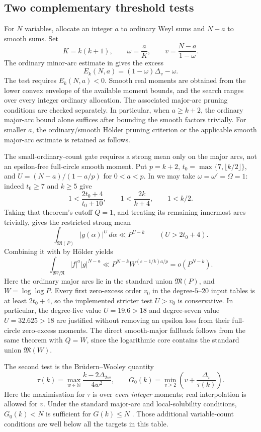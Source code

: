 \documentclass[11pt,letterpaper]{article}
\numberwithin{equation}{section}
\begin{document}
\subsection{Two complementary threshold tests}

For $N$ variables, allocate an integer $a$ to ordinary Weyl sums and $N-a$
to smooth sums. Set
\[
 K=k(k+1),\qquad \omega=\frac aK,\qquad
 v=\frac{N-a}{1-\omega}.
\]
The ordinary minor-arc estimate in \cite[Lemma~3.1]{W16} gives the excess
\[
 E_k(N,a)=(1-\omega)\Delta_v-\omega.               \tag{S1}
\]
The test requires $E_k(N,a)<0$. Smooth real moments are obtained from the
lower convex envelope of the available moment bounds, and the search ranges
over every integer ordinary allocation. The associated major-arc pruning
conditions are checked separately. In particular, when $a\ge k+2$, the
ordinary major-arc bound alone suffices after bounding the smooth factors
trivially. For smaller $a$, the ordinary/smooth H\"older pruning criterion
or the applicable smooth major-arc estimate is retained as follows.

The small-ordinary-count gate requires a strong mean only on the major arcs,
not an epsilon-free full-circle smooth moment. Put
$p=k+2$, $t_0=\max\{7,\lfloor k/2\rfloor\}$, and
$U=(N-a)/(1-a/p)$ for $0<a<p$. In
\cite[Theorem~1.3]{BW24} we may take $\omega=\omega'=\Omega=1$:
indeed $t_0\ge7$ and $k\ge5$ give
\[
 1<\frac{2t_0+4}{t_0+10},\qquad
 1<\frac{2k}{k+4},\qquad 1<k/2.
\]
Taking that theorem's cutoff $Q=1$, and treating its remaining innermost
arcs trivially, gives the restricted strong mean
\[
 \int_{\mathfrak M(P)}|g(\alpha)|^U\,d\alpha
       \ll P^{U-k}\qquad(U>2t_0+4).
\]
Combining it with \cite[(4.1)]{W16} by H\"older yields
\[
 \int_{\mathfrak M\setminus\mathfrak N}|f|^a|g|^{N-a}
 \ll P^{N-k}W^{(\varepsilon-1/k)a/p}=o(P^{N-k}).
\]
Here the ordinary major arcs lie in the standard union
$\mathfrak M(P)$, and $W=\log\log P$. Every first zero-excess order
$v_0$ in the degree-$5$--$20$ input tables is at least $2t_0+4$, so the
implemented stricter test $U>v_0$ is conservative. In particular, the
degree-five value $U=19.6>18$ and degree-seven value
$U=32.625>18$ are justified without removing an epsilon loss from their
full-circle zero-excess moments. The direct smooth-major fallback follows
from the same theorem with $Q=W$, since the logarithmic core contains the
standard union $\mathfrak M(W)$.

The second test is the Br\"udern--Wooley quantity
\[
 \tau(k)=\max_{w\in\mathbb N}\frac{k-2\Delta_{2w}}{4w^2},
 \qquad G_0(k)=\min_{v\ge2}\left(v+\frac{\Delta_v}{\tau(k)}\right).
                                                               \tag{S2}
\]
Here the maximisation for $\tau$ is over \emph{even integer} moments;
real interpolation is allowed for $v$. Under the standard major-arc and
local-solubility conditions, $G_0(k)<N$ is sufficient for $G(k)\le N$
\cite[Theorem~6.2]{BW23}. Those additional variable-count conditions are
well below all the targets in this table.
\end{document}
